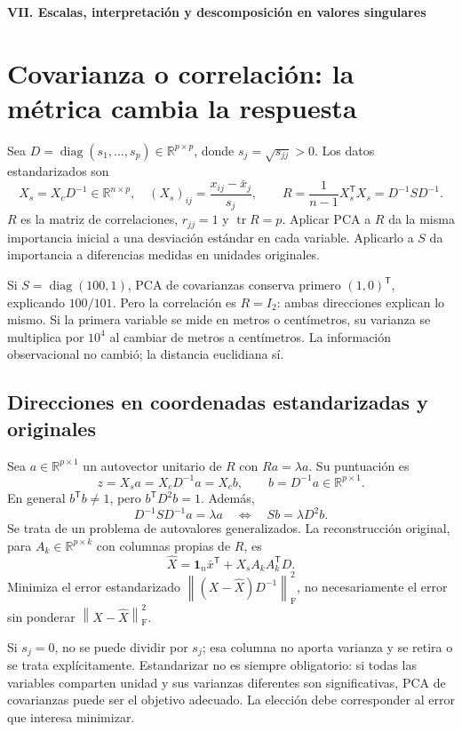\documentclass[11pt,a4paper]{article}
\newcommand{\R}{\mathbb R}
\newcommand{\T}{^{\mathsf T}}
\newcommand{\norm}[1]{\left\lVert #1\right\rVert}
\DeclareMathOperator{\tr}{tr}
\DeclareMathOperator{\diag}{diag}
\newcommand{\F}{_{\mathrm F}}
\newcommand{\ones}{\mathbf 1}
\theoremstyle{definition}
\newcommand{\parte}[1]{\par\bigskip\Needspace{8\baselineskip}\begin{center}{\Large\bfseries\color{azul}#1}\end{center}}
\begin{document}
\parte{VII. Escalas, interpretación y descomposición en valores singulares}
\section{Covarianza o correlación: la métrica cambia la respuesta}
Sea $D=\diag(s_1,\ldots,s_p)\in\R^{p\times p}$, donde $s_j=\sqrt{s_{jj}}>0$. Los datos estandarizados son
\[
X_s=X_cD^{-1}\in\R^{n\times p},\quad (X_s)_{ij}=\frac{x_{ij}-\bar x_j}{s_j},\qquad
R=\frac1{n-1}X_s\T X_s=D^{-1}SD^{-1}.
\]
$R$ es la matriz de correlaciones, $r_{jj}=1$ y $\tr R=p$. Aplicar PCA a $R$ da la misma importancia inicial a una desviación estándar en cada variable. Aplicarlo a $S$ da importancia a diferencias medidas en unidades originales.
\begin{ejemplo}
Si $S=\diag(100,1)$, PCA de covarianzas conserva primero $(1,0)\T$, explicando $100/101$. Pero la correlación es $R=I_2$: ambas direcciones explican lo mismo. Si la primera variable se mide en metros o centímetros, su varianza se multiplica por $10^4$ al cambiar de metros a centímetros. La información observacional no cambió; la distancia euclidiana sí.
\end{ejemplo}
\subsection{Direcciones en coordenadas estandarizadas y originales}
Sea $a\in\R^{p\times1}$ un autovector unitario de $R$ con $Ra=\lambda a$. Su puntuación es
\[
z=X_sa=X_cD^{-1}a=X_cb,\qquad b=D^{-1}a\in\R^{p\times1}.
\]
En general $b\T b\ne1$, pero $b\T D^2b=1$. Además,
\[
D^{-1}SD^{-1}a=\lambda a\quad\Longleftrightarrow\quad Sb=\lambda D^2b.
\]
Se trata de un problema de autovalores generalizados. La reconstrucción original, para $A_k\in\R^{p\times k}$ con columnas propias de $R$, es
\[
\widehat X=\ones_n\bar x\T+X_sA_kA_k\T D.
\]
Minimiza el error estandarizado $\norm{(X-\widehat X)D^{-1}}\F^2$, no necesariamente el error sin ponderar $\norm{X-\widehat X}\F^2$.
\begin{cuidado}
Si $s_j=0$, no se puede dividir por $s_j$; esa columna no aporta varianza y se retira o se trata explícitamente. Estandarizar no es siempre obligatorio: si todas las variables comparten unidad y sus varianzas diferentes son significativas, PCA de covarianzas puede ser el objetivo adecuado. La elección debe corresponder al error que interesa minimizar.
\end{cuidado}
\end{document}
